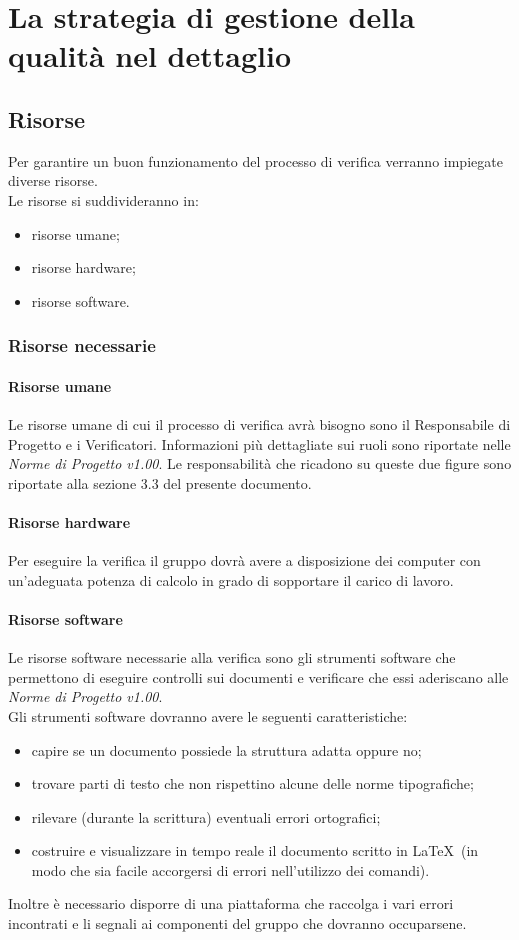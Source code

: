 \documentclass[../PianoDiQualifica.tex]{subfiles}
\begin{document}
\section{La strategia di gestione della qualità nel dettaglio}
		\subsection{Risorse}
		Per garantire un buon funzionamento del processo di verifica verranno impiegate diverse risorse.\\
		Le risorse si suddivideranno in:
		\begin{itemize}
			\item risorse umane;
			\item risorse hardware;
			\item risorse software.
		\end{itemize}
			\subsubsection{Risorse necessarie}
				\paragraph{Risorse umane}
				Le risorse umane di cui il processo di verifica avrà bisogno sono il Responsabile di Progetto e i Verificatori.
				Informazioni più dettagliate sui ruoli sono riportate nelle \textit{Norme di Progetto v1.00}. Le responsabilità che ricadono su queste due figure sono riportate alla sezione 3.3 del presente documento.
				\paragraph{Risorse hardware}
				Per eseguire la verifica il gruppo dovrà avere a disposizione dei computer con un'adeguata potenza di calcolo in grado di sopportare il carico di lavoro.		    
				\paragraph{Risorse software}
			    Le risorse software necessarie alla verifica sono gli strumenti software che permettono di eseguire controlli sui documenti e verificare che essi aderiscano alle \textit{Norme di Progetto v1.00}.\\
			    Gli strumenti software dovranno avere le seguenti caratteristiche:
			    \begin{itemize}
			    \item capire se un documento possiede la struttura adatta oppure no;
			    \item trovare parti di testo che non rispettino alcune delle norme tipografiche;
			    \item rilevare (durante la scrittura) eventuali errori ortografici;
			    \item costruire e visualizzare in tempo reale il documento scritto in \LaTeX\ (in modo che sia facile accorgersi di errori nell'utilizzo dei comandi).
			    \end{itemize}
			    Inoltre è necessario disporre di una piattaforma che raccolga i vari errori incontrati e li segnali ai componenti del gruppo che dovranno occuparsene. 
\end{document}
